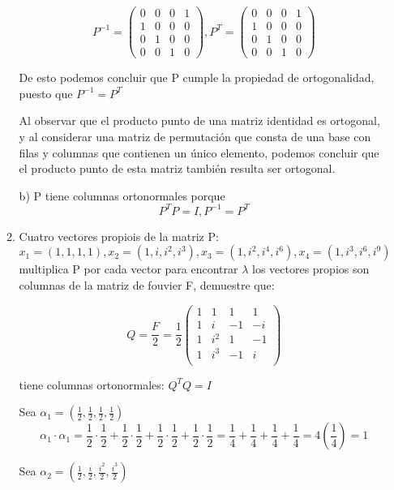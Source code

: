 \documentclass{report}
\begin{document}
\begin{enumerate}
\begin{enumerate}
    $$P^{-1}=\begin{pmatrix}
        0 & 0 & 0 & 1\\
        1 & 0 & 0 & 0\\
        0 & 1 & 0 & 0\\
        0 & 0 & 1 & 0 
    \end{pmatrix}
    ,P^{T}=\begin{pmatrix}
        0 & 0 & 0 & 1\\
        1 & 0 & 0 & 0\\
        0 & 1 & 0 & 0\\
        0 & 0 & 1 & 0 
    \end{pmatrix}$$
    
    De esto podemos concluir que P cumple la propiedad de ortogonalidad, puesto que $P^{-1}=P^T$
    
    Al observar que el producto punto de una matriz identidad es ortogonal, y al considerar una matriz de permutación que consta de una base con filas y columnas que contienen un único elemento, podemos concluir que el producto punto de esta matriz también resulta ser ortogonal. 
    
    b) P tiene columnas ortonormales porque $$P^TP=I, P^{-1}=P^T$$
    
    
    \item Cuatro vectores propiois de la matriz P:
    $$x_1=(1,1,1,1),x_2=(1,i,i^2,i^3),x_3=(1,i^2,i^4,i^6),x_4=(1,i^3,i^6,i^9)$$
    multiplica P por cada vector para encontrar $\lambda$ los vectores propios son columnas de la matriz de fouvier F, demuestre que:
    
    $$Q=\frac{F}{2}=\frac{1}{2}\begin{pmatrix}
        1&1&1&1\\
        1&i&-1&-i\\
        1&i^2&1&-1\\
        1&i^3&-1&i\\
    \end{pmatrix}$$
    
    tiene columnas ortonormales: $Q^{T}Q=I$
    
    Sea $\alpha_1=(\frac{1}{2},\frac{1}{2},\frac{1}{2},\frac{1}{2})$
    $$\alpha_1\cdot\alpha_1=\frac{1}{2}\cdot\frac{1}{2}+\frac{1}{2}\cdot\frac{1}{2}+\frac{1}{2}\cdot\frac{1}{2}+\frac{1}{2}\cdot\frac{1}{2}=\frac{1}{4}+\frac{1}{4}+\frac{1}{4}+\frac{1}{4}=4(\frac{1}{4})=1$$
    
    Sea $\alpha_2=(\frac{1}{2},\frac{i}{2},\frac{i^2}{2},\frac{i^3}{2})$
    

\end{enumerate}
\end{enumerate}
\end{document}
